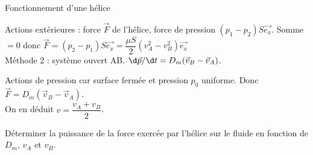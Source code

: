 \begin{exo}[PT][1]{Fonctionnement d'une hélice}
\begin{quest}
{Actions extérieures : force $\vec F$ de l'hélice, force de pression $(p_1-p_2)S \vec{e_x}$. Somme $=0$ donc $\vec F = (p_2-p_1)S \vec{e_x} = \dfrac{\mu S}{2}(v_A^2-v_B^2) \vec{e_x}$\\

Méthode 2 : système ouvert AB. $\d \vec p/\d t = D_m(\vec v_B-\vec v_A)$.

Actions de pression car surface fermée et pression $p_0$ uniforme. Donc $\vec F  = D_m(\vec v_B-\vec v_A)$.\\

On en déduit $v = \dfrac{v_A+v_B}{2}$.

}

\item Déterminer la puissance de la force exercée par l'hélice sur le fluide en fonction de $D_m$, $v_A$ et $v_B$.

\end{quest}
\end{exo}

